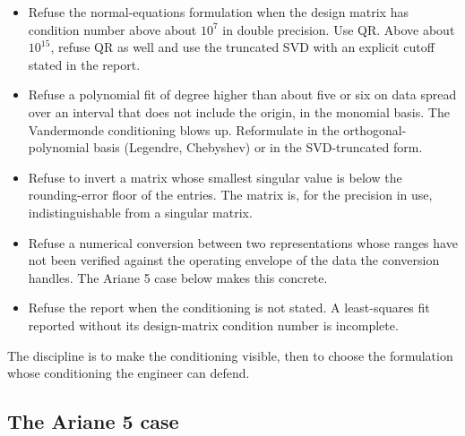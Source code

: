 \begin{itemize}[leftmargin=*]
  \item Refuse the normal-equations formulation when the design
    matrix has condition number above about $10^{7}$ in double
    precision. Use QR. Above about $10^{15}$, refuse QR as well
    and use the truncated SVD with an explicit cutoff stated in
    the report.
  \item Refuse a polynomial fit of degree higher than about five
    or six on data spread over an interval that does not include
    the origin, in the monomial basis. The Vandermonde
    conditioning blows up. Reformulate in the orthogonal-polynomial
    basis (Legendre, Chebyshev) or in the SVD-truncated form.
  \item Refuse to invert a matrix whose smallest singular value is
    below the rounding-error floor of the entries. The matrix is,
    for the precision in use, indistinguishable from a singular
    matrix.
  \item Refuse a numerical conversion between two representations
    whose ranges have not been verified against the operating
    envelope of the data the conversion handles. The Ariane 5
    case below makes this concrete.
  \item Refuse the report when the conditioning is not stated.
    A least-squares fit reported without its design-matrix
    condition number is incomplete.
\end{itemize}

The discipline is to make the conditioning visible, then to choose
the formulation whose conditioning the engineer can defend.

\subsection{The Ariane 5 case}

